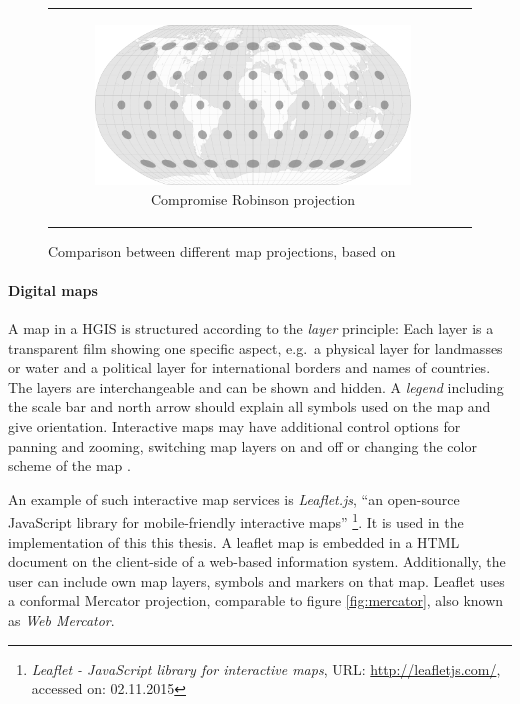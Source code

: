 \begin{figure}[H]
\begin{tabular}{c c}
\begin{subfigure}{0.5\textwidth}
      \centering
      \includegraphics[width=0.95\linewidth]{graphics/basics/hgis/projection_distortion_robinson.png}
      \caption{Compromise Robinson projection}
    \end{subfigure}
    & \\
  \end{tabular}
  \caption{Comparison between different map projections, based on \cite{mapProjections}}
  \label{fig:map_projections}
\end{figure}


\paragraph{Digital maps} %
\label{par:maps}

A map in a HGIS is structured according to the \emph{layer} principle: Each layer is a transparent film showing one specific aspect, e.g.\ a physical layer for landmasses or water and a political layer for international borders and names of countries. The layers are interchangeable and can be shown and hidden. A \emph{legend} including the scale bar and north arrow should explain all symbols used on the map and give orientation. Interactive maps may have additional control options for panning and zooming, switching map layers on and off or changing the color scheme of the map
\cite[pp. 159-166]{bolstad2008gis}.

An example of such interactive map services is \emph{Leaflet.js}, ``an open-source JavaScript library for mobile-friendly interactive maps''
\footnote{
  \textit{Leaflet - JavaScript library for interactive maps},
  URL: \url{http://leafletjs.com/},
  accessed on: 02.11.2015
}.
It is used in the implementation of this this thesis. A leaflet map is embedded in a HTML document on the client-side of a web-based information system. Additionally, the user can include own map layers, symbols and markers on that map. Leaflet uses a conformal Mercator projection, comparable to figure \ref{fig:mercator}, also known as \emph{Web Mercator}.

